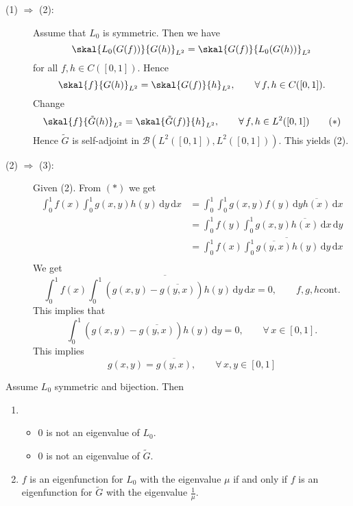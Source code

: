 \begin{beweis}
	
	\begin{description}
		\item[(1) $\Rightarrow$ (2):] Assume that $L_0$ is symmetric. Then we have \[
			\skal{L_0(G(f))}{G(h)}_{L^2} = \skal{G(f)}{L_0(G(h))}_{L^2}
		\] for all $f,h \in C([0,1])$. Hence
		\[
			\skal{f}{G(h)}_{L^2} = \skal{G(f)}{h}_{L^2}, \qquad \forall\, f,h \in C([0,1]). 
		\]
		Change
		\[
			\skal{f}{ \tilde G(h)}_{L^2} = \skal{ \tilde G(f)}{h}_{L^2}, \qquad \forall\, f,h \in L^2([0,1]) \qquad (*)
		\]
		Hence $\tilde G$ is self-adjoint in $\mathcal{B}(L^2([0,1]),L^2([0,1]))$.
		This yields (2).
		\item[(2) $\Rightarrow$ (3):]  Given (2). From $(*)$ we get 
		\begin{align*}
			\int_{0}^{1}f(x)\int_{0}^{1}g(x,y)h(y) \,\mathrm{d}y \,\mathrm{d}x &= \int_{0}^{1} \int_{0}^{1}g(x,y)f(y) \,\mathrm{d}y \overline{h(x)} \,\mathrm{d}x \\
			&= \int_{0}^{1}f(y) \int_{0}^{1}g(x,y) \overline{h(x)} \,\mathrm{d}x \,\mathrm{d}y \\
			&= \int_{0}^{1}f(x) \overline{\int_{0}^{1} \overline{g(y,x)}h(y) \,\mathrm{d}y} \,\mathrm{d}x \\
		\end{align*}
		We get
		\[
			\int_{0}^{1}f(x) \overline{\int_{0}^{1}(g(x,y)-\overline{g(y,x)})h(y) \,\mathrm{d}y} \,\mathrm{d}x = 0, \qquad f,g,h \text{cont.}
		\]
		This implies that
		\[
			\int_{0}^{1}(g(x,y)- \overline{g(y,x)}) h(y) \,\mathrm{d}y = 0, \qquad  \forall\, x \in [0,1].
		\]
		This implies 
		\[
			g(x,y) = \overline{g(y,x)}, \qquad \forall\, x,y \in [0,1]
		\]
	\end{description}
\end{beweis}
\begin{theorem}
	Assume $L_0$ symmetric and bijection. Then
	\begin{enumerate}
		\item \begin{itemize}
			\item $0$ is not an eigenvalue of $L_0$.
			\item $0$ is not an eigenvalue of $\tilde G$.
		\end{itemize}
		\item $f$ is an eigenfunction for $L_0$ with the eigenvalue $\mu$ if and only if $f$ is an eigenfunction for $\tilde G$ with the eigenvalue $\frac{1}{\mu}$.
	\end{enumerate}
\end{theorem}
